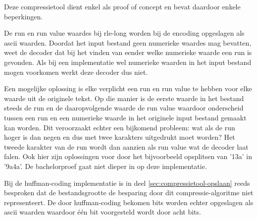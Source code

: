 Deze \gls{compressietool} dient enkel als proof of concept en bevat daardoor enkele beperkingen. 

De run en run value waardes bij \gls{rle-long} worden bij de \gls{encoding} opgeslagen als \gls{ascii} waarden. Doordat het input bestand geen numerieke waardes mag bevatten, weet de \gls{decoder} dat bij het vinden van eender welke numerieke waarde een run is gevonden. Als bij een implementatie wel numerieke waarden in het input bestand mogen voorkomen werkt deze \gls{decoder} dus niet. 

Een mogelijke oplossing is elke verplicht een run en run value te hebben voor elke waarde uit de originele tekst. Op die manier is de eerste waarde in het bestand steeds de run en de daaropvolgende waarde de run value waardoor onderscheid tussen een run en een numerieke waarde in het originele input bestand gemaakt kan worden. Dit veroorzaakt echter een bijkomend probleem: wat als de run hoger is dan negen en dus met twee karakters uitgedrukt moet worden? Het tweede karakter van de run wordt dan aanzien als run value wat de \gls{decoder} laat falen. Ook hier zijn oplossingen voor door het bijvoorbeeld opsplitsen van '13a' in '9a4a'. De bachelorproef gaat niet dieper in op deze implementatie.

Bij de \gls{huffman-coding} implementatie is in deel \ref{sec:compressietool-opslaan} reeds besproken dat de bestandsgrootte de besparing door dit \gls{compressie-algoritme} niet representeert. De door \gls{huffman-coding} bekomen bits worden echter opgeslagen als \gls{ascii} waarden waardoor één \gls{bit} voorgesteld wordt door acht \glspl{bit}.